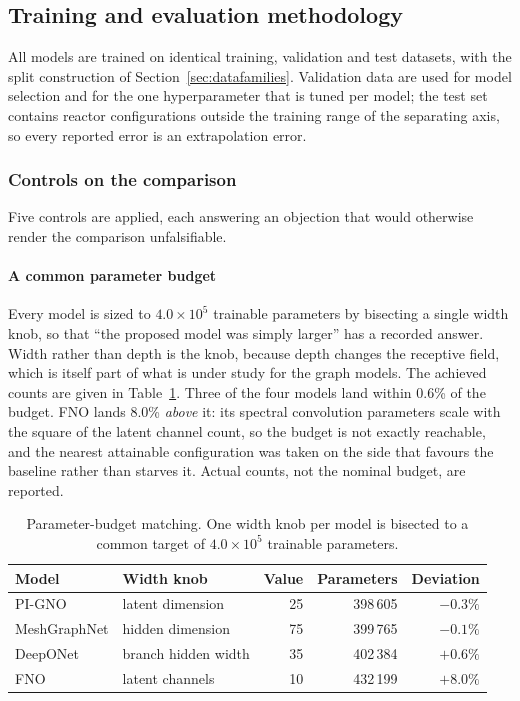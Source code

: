 \documentclass[preprint,12pt]{elsarticle}
\begin{document}
\subsection{Training and evaluation methodology}
\label{sec:training}

All models are trained on identical training, validation and test datasets,
with the split construction of Section~\ref{sec:datafamilies}. Validation data
are used for model selection and for the one hyperparameter that is tuned per
model; the test set contains reactor configurations outside the training range
of the separating axis, so every reported error is an extrapolation error.

\subsubsection{Controls on the comparison}
\label{sec:fairness-train}

Five controls are applied, each answering an objection that would otherwise
render the comparison unfalsifiable.

\paragraph{A common parameter budget} Every model is sized to
$4.0\times10^{5}$ trainable parameters by bisecting a single width knob, so that
``the proposed model was simply larger'' has a recorded answer. Width rather
than depth is the knob, because depth changes the receptive field, which is
itself part of what is under study for the graph models. The achieved counts are
given in Table~\ref{tab:budget}. Three of the four models land within
0.6\% of the budget. FNO lands 8.0\% \emph{above} it: its spectral convolution
parameters scale with the square of the latent channel count, so the budget is
not exactly reachable, and the nearest attainable configuration was taken on
the side that favours the baseline rather than starves it. Actual counts, not
the nominal budget, are reported.

\begin{table}[htbp]
\centering
\caption{Parameter-budget matching. One width knob per model is bisected to a
common target of $4.0\times10^{5}$ trainable parameters.}
\label{tab:budget}
\begin{tabular}{@{}llrrr@{}}
\toprule
Model & Width knob & Value & Parameters & Deviation \\
\midrule
PI-GNO       & latent dimension     & 25 & 398\,605 & $-0.3\%$ \\
MeshGraphNet & hidden dimension     & 75 & 399\,765 & $-0.1\%$ \\
DeepONet     & branch hidden width  & 35 & 402\,384 & $+0.6\%$ \\
FNO          & latent channels      & 10 & 432\,199 & $+8.0\%$ \\
\bottomrule
\end{tabular}
\end{table}
\end{document}

